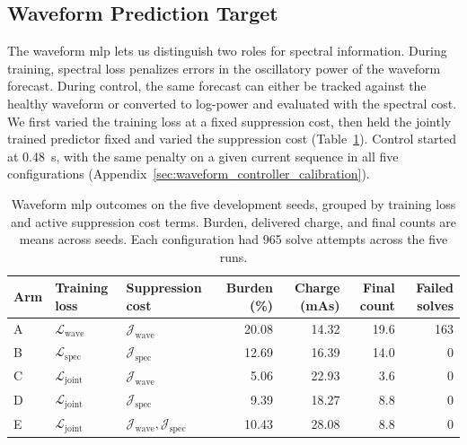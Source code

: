 \subsection{Waveform Prediction Target}\label{sec:waveform_prediction_closed_loop}

The waveform \ac{mlp} lets us distinguish two roles for spectral information.
During training, spectral loss penalizes errors in the oscillatory power of the waveform forecast.
During control, the same forecast can either be tracked against the healthy waveform or converted to log-power and evaluated with the spectral cost.
We first varied the training loss at a fixed suppression cost, then held the jointly trained predictor fixed and varied the suppression cost (Table~\ref{tab:waveform_loss_cost}).
Control started at \SI{0.48}{\second}, with the same penalty on a given current sequence in all five configurations (Appendix~\ref{sec:waveform_controller_calibration}). %

\begin{table}
  \centering
  \setlength{\tabcolsep}{4.5pt}
  \caption{Waveform \ac{mlp} outcomes on the five development seeds, grouped by training loss and active suppression cost terms.
  Burden, delivered charge, and final counts are means across seeds.
  Each configuration had 965 solve attempts across the five runs.}\label{tab:waveform_loss_cost}
  \begin{tabular}{@{}lllrrrr@{}}
    \toprule
    Arm & Training loss & Suppression cost & Burden (\%) & Charge (mAs) & Final count & Failed solves \\
    \midrule
    A & \(\mathcal{L}_\mathrm{wave}\) & \(\mathcal J_{\mathrm{wave}}\) & 20.08 & 14.32 & 19.6 & 163 \\
    B & \(\mathcal{L}_\mathrm{spec}\) & \(\mathcal J_{\mathrm{spec}}\) & 12.69 & 16.39 & 14.0 & 0 \\
    C & \(\mathcal{L}_\mathrm{joint}\) & \(\mathcal J_{\mathrm{wave}}\) & 5.06 & 22.93 & 3.6 & 0 \\
    D & \(\mathcal{L}_\mathrm{joint}\) & \(\mathcal J_{\mathrm{spec}}\) & 9.39 & 18.27 & 8.8 & 0 \\
    E & \(\mathcal{L}_\mathrm{joint}\) & \(\mathcal J_{\mathrm{wave}}, \mathcal J_{\mathrm{spec}}\) & 10.43 & 28.08 & 8.8 & 0 \\
    \bottomrule
  \end{tabular}
\end{table}

